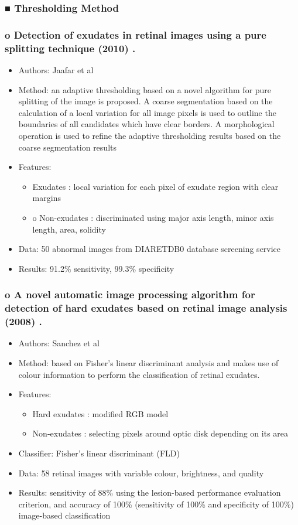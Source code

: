 \documentclass[12pt]{report}
\begin{document}
\subsubsection{■ Thresholding Method}
\subsubsection{o	Detection of exudates in retinal images using a pure splitting technique (2010) \cite{jaafar2010detection}.
}
\begin{itemize}
\item Authors: Jaafar et al
\item Method: an adaptive thresholding based on a novel algorithm for pure splitting of the image is proposed. A coarse segmentation based on the calculation of a local variation for all image pixels is used to outline the boundaries of all candidates which have clear borders. A morphological operation is used to refine the adaptive thresholding results based on the coarse segmentation results
\item Features:
\begin{itemize}
\item Exudates : local variation for each pixel of exudate region with clear margins
\item o	Non-exudates : discriminated using major axis length, minor axis length, area, solidity
\end{itemize}
\item Data: 50 abnormal images from DIARETDB0 database screening service
\item Results: 91.2\% sensitivity, 99.3\% specificity
\end{itemize}

\subsubsection{o	A novel automatic image processing algorithm for detection of hard exudates based on retinal image analysis (2008) \cite{sanchez2008novel}.
}
\begin{itemize}
\item Authors: Sanchez et al
\item Method: based on Fisher’s linear discriminant analysis and makes use of colour information to perform the classification of retinal exudates.
\item Features:
\begin{itemize}
\item Hard exudates : modified RGB model
\item Non-exudates : selecting pixels around optic disk depending on its area
\end{itemize}
\item Classifier: Fisher’s linear discriminant (FLD)
\item Data: 58 retinal images with variable colour, brightness, and quality
\item Results: sensitivity of 88\% using the lesion-based performance evaluation criterion, and accuracy of 100\% (sensitivity of 100\% and specificity of 100\%) image-based classification
\end{itemize}
\end{document}
